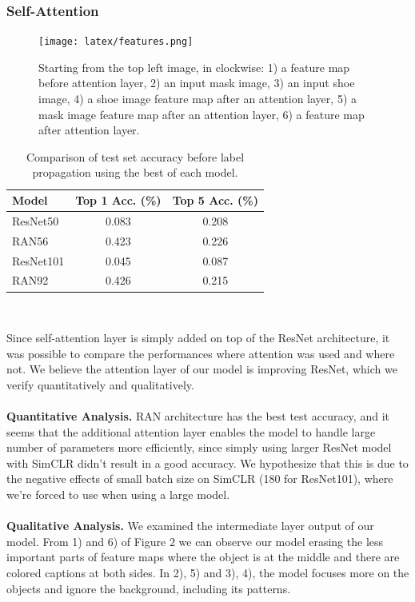\documentclass[10pt,twocolumn,letterpaper]{article}
\begin{document}
\subsubsection{Self-Attention}
\begin{figure}
\centering
\texttt{[image: latex/features.png]}
\label{fig:features}
\caption{Starting from the top left image, in clockwise: 1) a feature map before attention layer, 2) an input mask image, 3) an input shoe image, 4) a shoe image feature map after an attention layer, 5) a mask image feature map after an attention layer, 6) a feature map after attention layer.}
\end{figure}
\begin{table}
\centering
\label{table:RANvsResNet}
\begin{tabular}{ ||p{1.45cm}|c c||  }
 \hline
 Model & Top 1 Acc. (\%) & Top 5 Acc. (\%)\\
 \hline
 ResNet50&  0.083 & 0.208  \\
 RAN56&  0.423 & 0.226  \\
 ResNet101&  0.045 & 0.087  \\
 RAN92&  0.426 & 0.215  \\
 \hline
\end{tabular} \\ [1ex]
 \caption{Comparison of test set accuracy before label propagation using the best of each model.}
\end{table}
Since self-attention layer is simply added on top of the ResNet architecture, it was possible to compare the performances where attention was used and where not. We believe the attention layer of our model is improving ResNet, which we verify quantitatively and qualitatively.\\\\ \textbf{Quantitative Analysis.} RAN architecture has the best test accuracy, and it seems that the additional attention layer enables the model to handle large number of parameters more efficiently, since simply using larger ResNet model with SimCLR didn't result in a good accuracy. We hypothesize that this is due to the negative effects of small batch size on SimCLR (180 for ResNet101), where we're forced to use when using a large model. \\\\
\textbf{Qualitative Analysis.} We examined the intermediate layer output of our model. From 1) and 6) of Figure $2$ we can observe our model erasing the less important parts of feature maps where the object is at the middle and there are colored captions at both sides. In 2), 5) and 3), 4), the model focuses more on the objects and ignore the background, including its patterns. 
\end{document}
